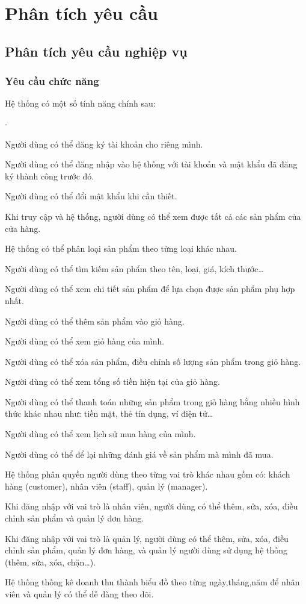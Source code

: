 \chapter{Phân tích yêu cầu}
\section{Phân tích yêu cầu nghiệp vụ}
\subsection{Yêu cầu chức năng}
Hệ thống có một số tính năng chính sau:
\begin {list} {-}{}
    \item Người dùng có thể đăng ký tài khoản cho riêng mình.
    \item Người dùng có thể đăng nhập vào hệ thống với tài khoản và mật khẩu đã đăng ký thành công trước đó.
    \item Người dùng có thể đổi mật khẩu khi cần thiết.
    \item Khi truy cập và hệ thống, người dùng có thể xem được tất cả các sản phẩm của cửa hàng.
    \item Hệ thống có thể phân loại sản phẩm theo từng loại khác nhau.
    \item Người dùng có thể tìm kiếm sản phẩm theo tên, loại, giá, kích thước\dots
    \item Người dùng có thể xem chi tiết sản phẩm để lựa chọn được sản phẩm phụ hợp nhất.
    \item Người dùng có thể thêm sản phẩm vào giỏ hàng.
    \item Người dùng có thể xem giỏ hàng của mình.
    \item Người dùng có thể xóa sản phẩm, điều chỉnh số lượng sản phẩm trong giỏ hàng.
    \item Người dùng có thể xem tổng số tiền hiện tại của giỏ hàng.
    \item Người dùng có thể thanh toán những sản phẩm trong giỏ hàng bằng nhiều hình thức khác nhau như: tiền mặt, thẻ tín dụng, ví điện tử\dots
    \item Người dùng có thể xem lịch sử mua hàng của mình.
    \item Người dùng có thể để lại những đánh giá về sản phẩm mà mình đã mua.
    \item Hệ thống phân quyền người dùng theo từng vai trò khác nhau gồm có: khách hàng (customer), nhân viên (staff), quản lý (manager).
    \item Khi đăng nhập với vai trò là nhân viên, người dùng có thể thêm, sửa, xóa, điều chỉnh sản phẩm và quản lý đơn hàng.
    \item Khi đăng nhập với vai trò là quản lý, người dùng có thể thêm, sửa, xóa, điều chỉnh sản phẩm, quản lý đơn hàng, và quản lý người dùng sử dụng hệ thống (thêm, sửa, xóa, chặn\dots).
    \item Hệ thống thống kê doanh thu thành biểu đồ theo từng ngày,tháng,năm để nhân viên và quản lý có thể dễ dàng theo dõi.
\end {list}
